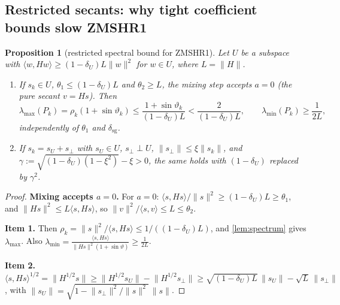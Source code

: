 \documentclass[11pt]{article}
\newtheorem{proposition}[theorem]{Proposition}
\theoremstyle{definition}
\theoremstyle{remark}
\newcommand{\inner}[2]{\langle #1,#2\rangle}
\newcommand{\norm}[1]{\lVert #1\rVert}
\newcommand{\lmin}{\lambda_{\min}}
\newcommand{\lmax}{\lambda_{\max}}
\newcommand{\dsg}{\delta_{\mathrm{sg}}}
\begin{document}
\subsection{Restricted secants: why tight coefficient bounds slow ZMSHR1}

\begin{proposition}[restricted spectral bound for ZMSHR1]\label{prop:restrictedzm}
Let $U$ be a subspace with $\inner w{Hw}\geq(1-\delta_U)L\norm w^2$ for $w\in U$, where $L=\norm H$.
\begin{enumerate}
\item If $s_k\in U$, $\theta_1\leq(1-\delta_U)L$ and $\theta_2\geq L$, the mixing step accepts $a=0$ (the pure
  secant $v=Hs$). Then
  \[
  \lmax(P_k)=\rho_k(1+\sin\vartheta_k)\leq\frac{1+\sin\vartheta_k}{(1-\delta_U)L}<\frac2{(1-\delta_U)L},\qquad\lmin(P_k)\geq\frac1{2L},
  \]
  independently of $\theta_1$ and $\dsg$.
\item If $s_k=s_U+s_\perp$ with $s_U\in U$, $s_\perp\perp U$, $\norm{s_\perp}\leq\xi\norm{s_k}$, and
  $\gamma:=\sqrt{(1-\delta_U)(1-\xi^2)}-\xi>0$, the same holds with $(1-\delta_U)$ replaced by $\gamma^2$.
\end{enumerate}
\end{proposition}
\begin{proof}
\textbf{Mixing accepts $a=0$.} For $a=0$: $\inner s{Hs}/\norm s^2\geq(1-\delta_U)L\geq\theta_1$, and
$\norm{Hs}^2\leq L\inner s{Hs}$, so $\norm v^2/\inner sv\leq L\leq\theta_2$.

\textbf{Item 1.} Then $\rho_k=\norm s^2/\inner s{Hs}\leq1/((1-\delta_U)L)$, and \cref{lem:spectrum} gives
$\lmax$. Also $\lmin=\frac{\inner s{Hs}}{\norm{Hs}^2(1+\sin\vartheta)}\geq\frac1{2L}$.

\textbf{Item 2.} $\inner s{Hs}^{1/2}=\norm{H^{1/2}s}\geq\norm{H^{1/2}s_U}-\norm{H^{1/2}s_\perp}\geq\sqrt{(1-\delta_U)L}\,\norm{s_U}-\sqrt L\,\norm{s_\perp}$,
with $\norm{s_U}=\sqrt{1-\norm{s_\perp}^2/\norm s^2}\,\norm s$.
\end{proof}
\end{document}
